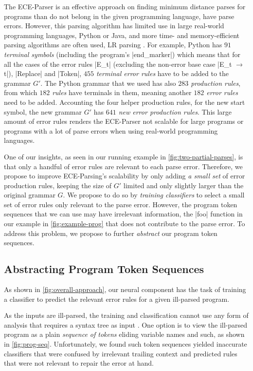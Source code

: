 The ECE-Parser is an effective approach on finding minimum distance parses for
programs than do not belong in the given programming language, \ie have parse
errors. However, this parsing algorithm has limited use in large real-world
programming languages, \eg Python or Java, and more time- and memory-efficient
parsing algorithms are often used, \eg LR parsing \etc \citep{Knuth_1965,
Chapman_1987}. For example, Python has \emph{$91$ terminal symbols} (including
the program's |end_marker|) which means that for all the cases of the error
rules |E_t| (excluding the non-error base case |E_t $\rightarrow$ t|), |Replace|
and |Token|, \emph{$455$ terminal error rules} have to be added to the grammar
$G'$. The Python grammar that we used has also \emph{$283$ production rules},
from which \emph{$182$ rules} have terminals in them, meaning another
\emph{$182$ error rules} need to be added. Accounting the four helper production
rules, \eg for the new start symbol, the new grammar $G'$ has \emph{$641$ new
error production rules}. This large amount of error rules renders the ECE-Parser
not scalable for large programs or programs with a lot of parse errors when
using real-world programming languages.

One of our insights,
as seen in our running example in \autoref{fig:two-partial-parses}, is that only
a handful of error rules are relevant to each parse error. Therefore, we
propose to improve ECE-Parsing's scalability by only adding \emph{a
small set} of error production rules, \ie keeping the size of $G'$ limited and
only slightly larger than the original grammar $G$. We propose to do so by
\emph{training classifiers} to select a small set of error rules only relevant
to the parse error. However, the program token sequences that we can use
may have irrelevant information, \eg the |foo| function in our example in
\autoref{fig:example-prog} that does not contribute to the parse error. To
address this problem, we propose to further \emph{abstract} our program token
sequences.

\subsection{Abstracting Program Token Sequences}
\label{sec:overview:abstraction}

As shown in \autoref{fig:overall-approach}, our neural component has the task of
training a classifier to predict the relevant error rules for a given ill-parsed
program.

%
As the inputs are ill-parsed, the training and classification
cannot use any form of analysis that requires a syntax tree as
input \citep{Sakkas_2020, Martinez_2013, Gulwani_2018, Wang_2018}.
%
One option is to view the ill-parsed program as a
plain \emph{sequence of tokens} eliding variable
names and such, as shown in \autoref{fig:prog-seq}.
%
Unfortunately, we found such token sequences yielded inaccurate classifiers that
were confused by irrelevant trailing context and predicted rules that were not
relevant to repair the error at hand.


